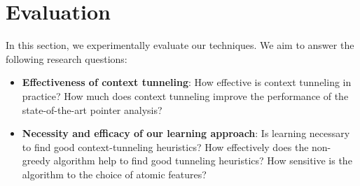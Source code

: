  \section{Evaluation}
In this section, we experimentally evaluate our techniques. %
We aim to answer the following research questions:

\begin{itemize}
\item {\bf Effectiveness of context tunneling}: How effective is
  context tunneling in practice? How much does context tunneling
  improve the performance of the state-of-the-art pointer analysis?

\item {\bf Necessity and efficacy of our learning
    approach}:
  Is learning necessary
  to find good context-tunneling heuristics?
  How effectively does the non-greedy algorithm help to find good
  tunneling heuristics?
How sensitive is the
  algorithm to the choice of atomic features?








\end{itemize}
